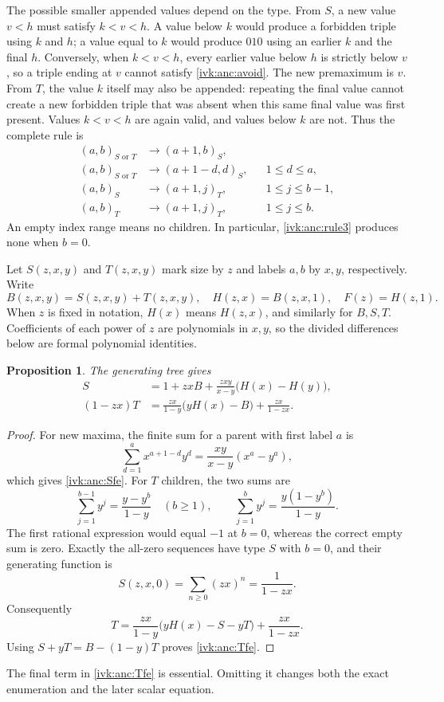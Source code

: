 \documentclass[11pt,letterpaper]{article}
\newtheorem{proposition}[theorem]{Proposition}
\theoremstyle{remark}\newtheorem{remark}[theorem]{Remark}
\begin{document}
The possible smaller appended values depend on the type. From $S$,
a new value $v<h$ must satisfy $k<v<h$. A value below $k$ would
produce a forbidden triple using $k$ and $h$; a value equal to $k$
would produce $010$ using an earlier $k$ and the final $h$.
Conversely, when $k<v<h$, every earlier value below $h$ is strictly
below $v$, so a triple ending at $v$ cannot satisfy \eqref{ivk:anc:avoid}.
The new premaximum is $v$. From $T$, the value $k$ itself may also
be appended: repeating the final value cannot create a new forbidden
triple that was absent when this same final value was first present.
Values $k<v<h$ are again valid, and values below $k$ are not.
Thus the complete rule is
\begin{align}
 (a,b)_{S\text{ or }T}&\longrightarrow(a+1,b)_S,
                                      &&\label{ivk:anc:rule1}\\
 (a,b)_{S\text{ or }T}&\longrightarrow(a+1-d,d)_S,
                  &&1\le d\le a,\label{ivk:anc:rule2}\\
 (a,b)_S&\longrightarrow(a+1,j)_T,
                  &&1\le j\le b-1,\label{ivk:anc:rule3}\\
 (a,b)_T&\longrightarrow(a+1,j)_T,
                  &&1\le j\le b.\label{ivk:anc:rule4}
\end{align}
An empty index range means no children. In particular,
\eqref{ivk:anc:rule3} produces none when $b=0$.

Let $S(z,x,y)$ and $T(z,x,y)$ mark size by $z$ and labels $a,b$ by
$x,y$, respectively. Write
\[
 B(z,x,y)=S(z,x,y)+T(z,x,y),\quad
 H(z,x)=B(z,x,1),\quad F(z)=H(z,1).
\]
When $z$ is fixed in notation, $H(x)$ means $H(z,x)$, and similarly
for $B,S,T$. Coefficients of each power of $z$ are polynomials in
$x,y$, so the divided differences below are formal polynomial
identities.

\begin{proposition}\label{ivk:anc:prop:fe}
The generating tree gives
\begin{align}
 S&=1+zxB+\frac{zxy}{x-y}\bigl(H(x)-H(y)\bigr),\label{ivk:anc:Sfe}\\
 (1-zx)T&=\frac{zx}{1-y}\bigl(yH(x)-B\bigr)
                                      +\frac{zx}{1-zx}.\label{ivk:anc:Tfe}
\end{align}
\end{proposition}
\begin{proof}
For new maxima, the finite sum for a parent with first label $a$ is
\[
 \sum_{d=1}^a x^{a+1-d}y^d
       =\frac{xy}{x-y}(x^a-y^a),
\]
which gives \eqref{ivk:anc:Sfe}. For $T$ children, the two sums are
\[
 \sum_{j=1}^{b-1}y^j=\frac{y-y^b}{1-y}\quad(b\ge1),
 \qquad \sum_{j=1}^b y^j=\frac{y(1-y^b)}{1-y}.
\]
The first rational expression would equal $-1$ at $b=0$, whereas
the correct empty sum is zero. Exactly the all-zero sequences
have type $S$ with $b=0$, and their generating function is
\[
 S(z,x,0)=\sum_{n\ge0}(zx)^n=\frac1{1-zx}.
\]
Consequently
\[
 T=\frac{zx}{1-y}\bigl(yH(x)-S-yT\bigr)+\frac{zx}{1-zx}.
\]
Using $S+yT=B-(1-y)T$ proves \eqref{ivk:anc:Tfe}.
\end{proof}
The final term in \eqref{ivk:anc:Tfe} is essential. Omitting it changes
both the exact enumeration and the later scalar equation.
\end{document}

